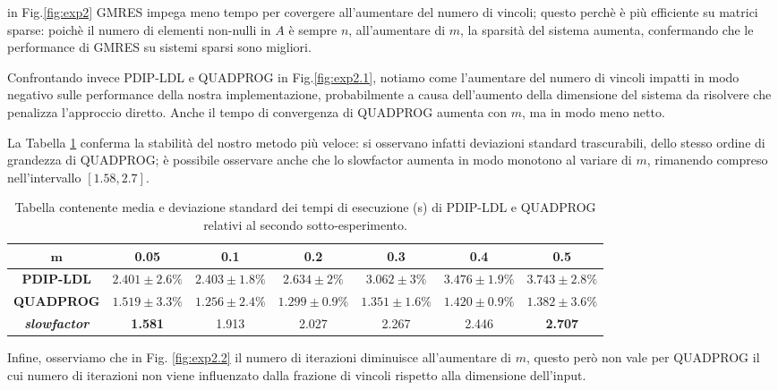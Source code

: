 in Fig.\ref{fig:exp2} GMRES impega meno tempo per covergere all'aumentare del numero di vincoli; questo perchè è più efficiente su matrici sparse: poichè il numero di elementi non-nulli in $A$ è sempre $n$, all'aumentare di $m$, la sparsità del sistema aumenta, confermando che le performance di GMRES su sistemi sparsi sono migliori.

Confrontando invece PDIP-LDL e QUADPROG in Fig.\ref{fig:exp2.1}, notiamo come l'aumentare del numero di vincoli impatti in modo negativo sulle performance della nostra implementazione, probabilmente a causa dell'aumento della dimensione del sistema da risolvere che penalizza l'approccio diretto. Anche il tempo di convergenza di QUADPROG aumenta con $m$, ma in modo meno netto. 

La Tabella \ref{tab:ldlqp2} conferma la stabilità del nostro metodo più veloce: si osservano infatti deviazioni standard trascurabili, dello stesso ordine di grandezza di QUADPROG; è possibile osservare anche che lo slowfactor aumenta in modo monotono al variare di $m$, rimanendo compreso nell'intervallo $[1.58, 2.7]$.

\begin{table}[!h]
\centering
\begin{tabular}{c|c|c|c|c|c|c}

$\mathbf{m}$            & \textbf{0.05} & \textbf{0.1} & \textbf{0.2} & \textbf{0.3} & \textbf{0.4} & \textbf{0.5} \\ \hline
\textbf{PDIP-LDL}                    & $2.401 \pm 2.6\%$       & $2.403 \pm 1.8\%$       & $2.634     \pm 2\%$   & $3.062 \pm 3\%$      & $3.476 \pm 1.9\%$      & $3.743 \pm 2.8\%$       \\
\textbf{QUADPROG}                    & $1.519 \pm 3.3\%$       & $1.256 \pm 2.4\%$       & $1.299 \pm 0.9\%$       & $1.351 \pm 1.6\%$       & $1.420 \pm 0.9\%$       & $1.382 \pm 3.6\%$       \\
\textbf{\textit{slowfactor}} &\textbf{1.581}        & 1.913       & 2.027       & 2.267       & 2.446       & \textbf{2.707} 
\end{tabular}
\caption{Tabella contenente media e deviazione standard dei tempi di esecuzione (s) di PDIP-LDL e QUADPROG relativi al secondo sotto-esperimento.\label{tab:ldlqp2}}
\end{table}

Infine, osserviamo che in Fig. \ref{fig:exp2.2} il numero di iterazioni diminuisce all'aumentare di $m$, questo però non vale per QUADPROG il cui numero di iterazioni non viene influenzato dalla frazione di vincoli rispetto alla dimensione dell'input.


